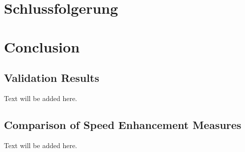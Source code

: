   {\chapter{Schlussfolgerung}}
  {\chapter{Conclusion}}

\label{sec:results}

\section{Validation Results}
Text will be added here.

\section{Comparison of Speed Enhancement Measures}
Text will be added here.

